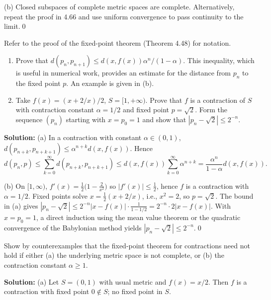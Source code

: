 (b) Closed subspaces of complete metric spaces are complete. Alternatively, repeat the proof in 4.66 and use uniform convergence to pass continuity to the limit.\qed



\begin{problembox}
Refer to the proof of the fixed-point theorem (Theorem 4.48) for notation.
\begin{enumerate}[label=(\alph*)]
\item Prove that $d(p_n, p_{n+1}) \leq d(x, f(x)) \alpha^n / (1 - \alpha)$. This inequality, which is useful in numerical work, provides an estimate for the distance from $p_n$ to the fixed point $p$. An example is given in (b).
\item Take $f(x) = (x + 2/x)/2$, $S = [1, +\infty)$. Prove that $f$ is a contraction of $S$ with contraction constant $\alpha = 1/2$ and fixed point $p = \sqrt{2}$. Form the sequence $(p_n)$ starting with $x=p_0=1$ and show that $|p_n - \sqrt{2}| \le 2^{-n}$.
\end{enumerate}
\end{problembox}

\noindent\textbf{Solution:}
(a) In a contraction with constant $\alpha\in(0,1)$, $d(p_{n+k},p_{n+k+1})\le \alpha^{n+k}d(x,f(x))$. Hence
\[
d(p_n,p)\le \sum_{k=0}^{\infty} d(p_{n+k},p_{n+k+1})\le d(x,f(x))\sum_{k=0}^{\infty}\alpha^{n+k}=\frac{\alpha^n}{1-\alpha}d(x,f(x)).
\]

(b) On $[1,\infty)$, $f'(x)=\tfrac12\big(1-\tfrac{2}{x^2}\big)$ so $|f'(x)|\le \tfrac12$, hence $f$ is a contraction with $\alpha=1/2$. Fixed points solve $x=\tfrac12(x+2/x)$, i.e., $x^2=2$, so $p=\sqrt2$. The bound in (a) gives $|p_n-\sqrt2|\le 2^{-n}|x-f(x)|\cdot\tfrac{1}{1-1/2}=2^{-n}\cdot 2|x-f(x)|$. With $x=p_0=1$, a direct induction using the mean value theorem or the quadratic convergence of the Babylonian method yields $|p_n-\sqrt2|\le 2^{-n}$.\qed



\begin{problembox}
Show by counterexamples that the fixed-point theorem for contractions need not hold if either (a) the underlying metric space is not complete, or (b) the contraction constant $\alpha \ge 1$.
\end{problembox}

\noindent\textbf{Solution:}
(a) Let $S=(0,1)$ with usual metric and $f(x)=x/2$. Then $f$ is a contraction with fixed point $0\notin S$; no fixed point in $S$.

